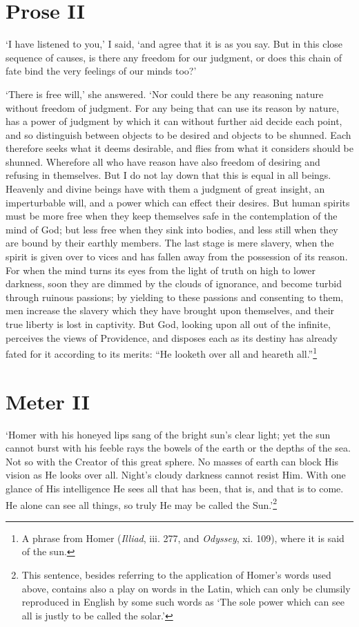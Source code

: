 \section{Prose II}

`I have listened to you,' I said, `and agree that it is as you say.
But in this close sequence of causes, is there any freedom for our
judgment, or does this chain of fate bind the very feelings of our
minds too?'

`There is free will,' she answered. `Nor could there be any reasoning
nature without freedom of judgment. For any being that can use its
reason by nature, has a power of judgment by which it can without
further aid decide each point, and so distinguish between objects to
be desired and objects to be shunned. Each therefore seeks what it
deems desirable, and flies from what it considers should be shunned.
Wherefore all who have reason have also freedom of desiring and
refusing in themselves. But I do not lay down that this is equal in
all beings. Heavenly and divine beings have with them a judgment of
great insight, an imperturbable will, and a power which can effect
their desires. But human  spirits must be more free when
they keep themselves safe in the contemplation of the mind of God; but
less free when they sink into bodies, and less still when they are
bound by their earthly members. The last stage is mere slavery, when
the spirit is given over to vices and has fallen away from the
possession of its reason. For when the mind turns its eyes from the
light of truth on high to lower darkness, soon they are dimmed by the
clouds of ignorance, and become turbid through ruinous passions; by
yielding to these passions and consenting to them, men increase the
slavery which they have brought upon themselves, and their true
liberty is lost in captivity. But God, looking upon all out of the
infinite, perceives the views of Providence, and disposes each as its
destiny has already fated for it according to its merits: ``He looketh
over all and heareth all.''\footnote{A phrase from Homer
(\textit{Illiad}, iii. 277, and \textit{Odyssey}, xi. 109), where it
is said of the sun.}

\section{Meter II}

`Homer with his honeyed lips sang of the bright sun's clear light; yet
the sun cannot burst with his feeble rays the bowels of the earth or
the depths of the sea. Not so with the Creator of this great sphere.
No masses of earth can block His vision as He looks over all. Night's
cloudy darkness cannot resist Him. With one glance of His intelligence
He sees all that has been, that is, and that is to come.  He
alone can see all things, so truly He may be called the
Sun.'\footnote{This sentence, besides referring to the application of
Homer's words used above, contains also a play on words in the Latin,
which can only be clumsily reproduced in English by some such words as
`The sole power which can see all is justly to be called the
solar.'}

